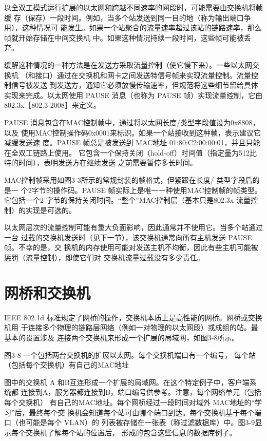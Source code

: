 以全双工模式运行扩展的以太网和跨越不同速率的网段时，可能需要由交换机将帧缓
存（保存）一段时间。例如，当多个站发送到同一目的地（称为输出端口争用），这种情况可
能发生。如果一个站聚合的流量速率超过该站的链路速率，那么帧就开始存储在中间交换机
中。如果这种情况持续一段时间，这些帧可能被丢弃。

缓解这种情况的一种方法是在发送方采取流量控制（使它慢下来）。一些以太网交换机
（和接口）通过在交换机和网卡之间发送特信号帧来实现流量控制。流量控制信号被发送
到发送方，通知它必须放慢传输速率，但规范将这些细节留给具体实现来完成。以太网使用
PAUSE 消息（也称为 PAUSE 帧）实现流量控制，它由802.3x［802.3-2008］来定义。

PAUSE 消息包含在MAC控制帧中，通过将以太网长度/类型字段值设为0x8808，以及
使用MAC控制操作码0x0001来标识。如果一个站接收到这种帧，表示建议它减缓发送速
度。PAUSE 帧总是被发送到 MAC地址 01:80:C2:00:00:01，并且只能在全双工链路上使用。
它包含一个保持关闭（hold-off）时间值（指定量为512比特的时间），表明发送方在继续发送
之前需要暂停多长时间。

MAC控制帧采用如图3-3所示的常规封装的帧格式，但紧跟在长度/ 类型字段后的是一
个2字节的操作码。PAUSE 帧实际上是唯一一种使用MAC控制帧的帧类型。它包括一个2
字节的保持关闭时间。“整个”MAC控制层（基本只是802.3x 流量控制）的实现是可选的。

以太网层次的流量控制可能有重大负面影响，因此通常并不使用它。当多个站通过一台
过载的交换机发送时（见下一节），该交换机通常向所有主机发送 PAUSE 帧。不幸的是，交
换机的内存使用可能对发送主机不均衡，因此有些主机可能被惩罚（流量控制），即使它们对
交换机流量过载没有多少责任。

\section{网桥和交换机}

IEEE 802.1d 标准规定了网桥的操作，交换机本质上是高性能的网桥。网桥或交换机用
于连接多个物理的链路层网络（例如一对物理的以太网段）或成组的站。最基本的设置涉及
连接两个交换机来形成一个扩展的局域网，如图3-8所示。

图3-8 一个包括两台交换机的扩展以太网。每个交换机端口有一个编号，
每个站（包括每个交换机）有自己的MAC地址

图中的交换机 A 和B互连形成一个扩展的局域网。在这个特定例子中，客户端系统都
连接到A，服务器都连接到B，端口编号供参考。注意，每个网络单元（包括每个交换机）
有自己的MAC地址。每个网桥经过一段时间对域外 MAC地址的“学习”后，最终每个交
换机会知道每个站可由哪个端口到达。每个交换机基于每个端口（也可能是每个 VLAN）的
列表被存储在一张表（称过滤数据库）中。图3-9显示每个交换机了解每个站的位置后，
形成的包含这些信息的数据库例子。

